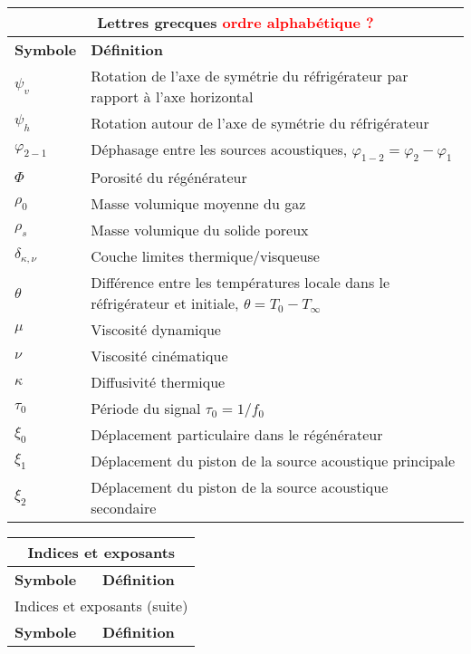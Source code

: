 \begin{center}
\bigskip

    \begin{longtable}{p{} p{}}
        \multicolumn{2}{c}{Lettres grecques \textcolor{red}{ordre alphabétique ?}}  \\\hline
        \textbf{Symbole} & \textbf{Définition} \\\hline\hline
        $\psi_v$ & Rotation de l'axe de symétrie du réfrigérateur par rapport à l'axe horizontal\\
        $\psi_h$ & Rotation autour de l'axe de symétrie du réfrigérateur \\
        $\varphi_{2-1}$ & Déphasage entre les sources acoustiques, $\varphi_{1-2} = \varphi_2 - \varphi_1$\\
        $\Phi$ & Porosité du régénérateur \\
        $\rho_0$ & Masse volumique moyenne du gaz \\
        $\rho_{s}$ & Masse volumique du solide poreux\\
        $\delta_{\kappa,\nu}$ & Couche limites thermique/visqueuse \\
        $\theta$ & Différence entre les températures locale dans le réfrigérateur et initiale, $\theta=T_0-T_\infty$\\
        $\mu$ & Viscosité dynamique \\
        $\nu$ & Viscosité cinématique \\
        $\kappa$ & Diffusivité thermique \\
        $\tau_0$ & Période du signal $\tau_0 = 1/f_0$ \\
        $\xi_0$ & Déplacement particulaire dans le régénérateur \\
        $\xi_1$ & Déplacement du piston de la source acoustique principale \\
        $\xi_2$ & Déplacement du piston de la source acoustique secondaire \\\hline
    \end{longtable}

\bigskip

    \begin{longtable}{p{} p{}}
        \multicolumn{2}{c}{Indices et exposants}  \\\hline
        \textbf{Symbole} & \textbf{Définition} \\\hline\hline \endfirsthead
        \multicolumn{2}{c}{Indices et exposants (suite)}  \\\hline
        \textbf{Symbole} & \textbf{Définition} \\\hline\hline \endhead
		

\end{longtable}
\end{center}
